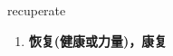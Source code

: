 
\begin{frame}
{\huge recuperate}
\begin{center}
\begin{enumerate}\Large
  \item \textbf{恢复(健康或力量)，康复}
\end{enumerate}
\end{center}
\end{frame}
